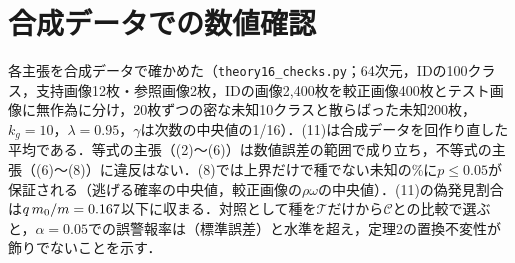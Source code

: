 \documentclass[a4paper,10pt,dvipdfmx]{jsarticle}
\theoremstyle{definition}
\newcommand{\cC}{\mathcal{C}}
\newcommand{\cT}{\mathcal{T}}
\begin{document}
\section{合成データでの数値確認}
各主張を合成データで確かめた（\texttt{theory16\_checks.py}；64次元，IDの100クラス，支持画像12枚・参照画像2枚，IDの画像2,400枚を較正画像400枚とテスト画像に無作為に分け，20枚ずつの密な未知10クラスと散らばった未知200枚，$k_g{=}10$，$\lambda{=}0.95$，$\gamma$は次数の中央値の1/16）．(11)は合成データを\NCkReps{}回作り直した平均である．等式の主張（(2)〜(6)）は数値誤差の範囲で成り立ち，不等式の主張（(6)〜(8)）に違反はない．(8)では上界だけで種でない未知の\NCkSepELeBnd\%に$p\le0.05$が保証される（逃げる確率の中央値\NCkSepEPi，較正画像の$\rho\omega$の中央値\NCkSepERhoOm）．(11)の偽発見割合は$q\,m_0/m=0.167$以下に収まる．対照として種を$\cT$だけから$\cC$との比較で選ぶと，$\alpha{=}0.05$での誤警報率は\NCkTonlyFive{}（標準誤差\NCkTonlyFiveSe）と水準を超え，定理2の置換不変性が飾りでないことを示す．
\begin{center}
\small

\end{center}
\end{document}
